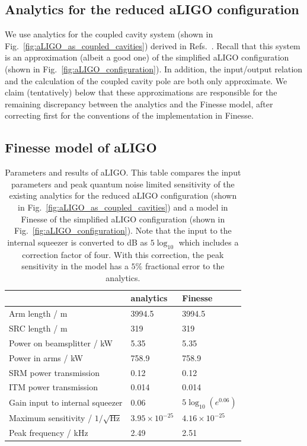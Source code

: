\documentclass[aps,pra,superscriptaddress,reprint,nofootinbib]{revtex4-1}
\begin{document}
\subsection{Analytics for the reduced aLIGO configuration}

We use analytics for the coupled cavity system (shown in Fig.~\ref{fig:aLIGO_as_coupled_cavities}) derived in Refs.~\cite{Korobko_2019,SOMIYA2016521}. Recall that this system is an approximation (albeit a good one) of the simplified aLIGO configuration (shown in Fig.~\ref{fig:aLIGO_configuration}). In addition, the input/output relation and the calculation of the coupled cavity pole are both only approximate. We claim (tentatively) below that these approximations are responsible for the remaining discrepancy between the analytics and the Finesse model, after correcting first for the conventions of the implementation in Finesse.


\subsection{Finesse model of aLIGO}

\begin{table}[ht]
	\centering
	\begin{tabular}{l|ll}
	 & analytics & Finesse \\ \hline
	Arm length / m & 3994.5 & 3994.5 \\
	SRC length / m & 319 & 319 \\
	Power on beamsplitter / kW & 5.35 & 5.35 \\
	Power in arms / kW & 758.9 & 758.9 \\
	SRM power transmission & 0.12 & 0.12 \\
	ITM power transmission & 0.014 & 0.014 \\
	Gain input to internal squeezer & 0.06 & $5 \log_{10}(e^{0.06})$ \\ \hline
	Maximum sensitivity / $1/\sqrt{\mathrm{Hz}}$ & $3.95 \times 10^{-25}$ & $4.16 \times 10^{-25}$ \\
	Peak frequency / kHz & 2.49 & 2.51
	\end{tabular}%
	\caption{Parameters and results of aLIGO. This table compares the input parameters and peak quantum noise limited sensitivity of the existing analytics for the reduced aLIGO configuration (shown in Fig.~\ref{fig:aLIGO_as_coupled_cavities}) and a model in Finesse of the simplified aLIGO configuration (shown in Fig.~\ref{fig:aLIGO_configuration}). Note that the input to the internal squeezer is converted to dB as $5 \log_{10}$ which includes a correction factor of four. With this correction, the peak sensitivity in the model has a $5\%$ fractional error to the analytics.}
	\label{tab:aLIGO_parameters}
\end{table}
\end{document}
